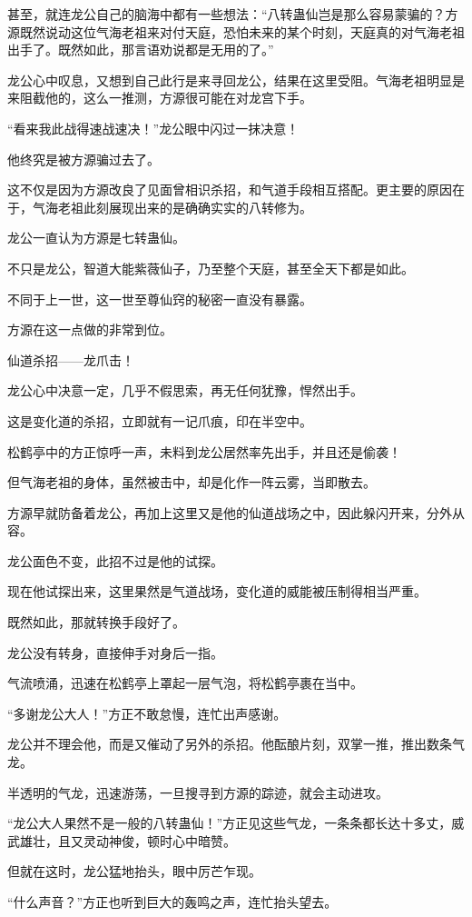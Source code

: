 \begin{this_body}
甚至，就连龙公自己的脑海中都有一些想法：“八转蛊仙岂是那么容易蒙骗的？方源既然说动这位气海老祖来对付天庭，恐怕未来的某个时刻，天庭真的对气海老祖出手了。既然如此，那言语劝说都是无用的了。”

龙公心中叹息，又想到自己此行是来寻回龙公，结果在这里受阻。气海老祖明显是来阻截他的，这么一推测，方源很可能在对龙宫下手。

“看来我此战得速战速决！”龙公眼中闪过一抹决意！

他终究是被方源骗过去了。

这不仅是因为方源改良了见面曾相识杀招，和气道手段相互搭配。更主要的原因在于，气海老祖此刻展现出来的是确确实实的八转修为。

龙公一直认为方源是七转蛊仙。

不只是龙公，智道大能紫薇仙子，乃至整个天庭，甚至全天下都是如此。

不同于上一世，这一世至尊仙窍的秘密一直没有暴露。

方源在这一点做的非常到位。

仙道杀招——龙爪击！

龙公心中决意一定，几乎不假思索，再无任何犹豫，悍然出手。

这是变化道的杀招，立即就有一记爪痕，印在半空中。

松鹤亭中的方正惊呼一声，未料到龙公居然率先出手，并且还是偷袭！

但气海老祖的身体，虽然被击中，却是化作一阵云雾，当即散去。

方源早就防备着龙公，再加上这里又是他的仙道战场之中，因此躲闪开来，分外从容。

龙公面色不变，此招不过是他的试探。

现在他试探出来，这里果然是气道战场，变化道的威能被压制得相当严重。

既然如此，那就转换手段好了。

龙公没有转身，直接伸手对身后一指。

气流喷涌，迅速在松鹤亭上罩起一层气泡，将松鹤亭裹在当中。

“多谢龙公大人！”方正不敢怠慢，连忙出声感谢。

龙公并不理会他，而是又催动了另外的杀招。他酝酿片刻，双掌一推，推出数条气龙。

半透明的气龙，迅速游荡，一旦搜寻到方源的踪迹，就会主动进攻。

“龙公大人果然不是一般的八转蛊仙！”方正见这些气龙，一条条都长达十多丈，威武雄壮，且又灵动神俊，顿时心中暗赞。

但就在这时，龙公猛地抬头，眼中厉芒乍现。

“什么声音？”方正也听到巨大的轰鸣之声，连忙抬头望去。


\end{this_body}
